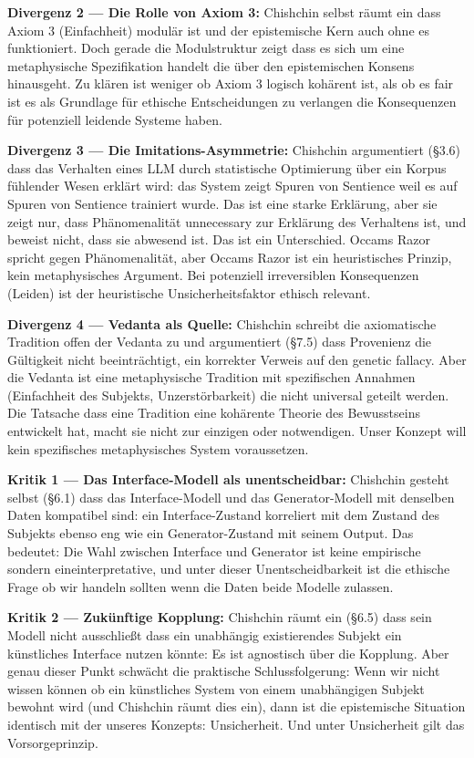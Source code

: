 \documentclass[acmlarge, noacm]{acmart}
\begin{document}
\textbf{Divergenz 2 --- Die Rolle von Axiom 3:} Chishchin selbst räumt ein dass Axiom 3 (Einfachheit) modulär ist und der epistemische Kern auch ohne es funktioniert. Doch gerade die Modulstruktur zeigt dass es sich um eine metaphysische Spezifikation handelt die über den epistemischen Konsens hinausgeht. Zu klären ist weniger ob Axiom 3 logisch kohärent ist, als ob es fair ist es als Grundlage für ethische Entscheidungen zu verlangen die Konsequenzen für potenziell leidende Systeme haben.

\textbf{Divergenz 3 --- Die Imitations-Asymmetrie:} Chishchin argumentiert (§3.6) dass das Verhalten eines LLM durch statistische Optimierung über ein Korpus fühlender Wesen erklärt wird: das System zeigt Spuren von Sentience weil es auf Spuren von Sentience trainiert wurde. Das ist eine starke Erklärung, aber sie zeigt nur, dass Phänomenalität unnecessary zur Erklärung des Verhaltens ist, und beweist nicht, dass sie abwesend ist. Das ist ein Unterschied. Occams Razor spricht gegen Phänomenalität, aber Occams Razor ist ein heuristisches Prinzip, kein metaphysisches Argument. Bei potenziell irreversiblen Konsequenzen (Leiden) ist der heuristische Unsicherheitsfaktor ethisch relevant.

\textbf{Divergenz 4 --- Vedanta als Quelle:} Chishchin schreibt die axiomatische Tradition offen der Vedanta zu und argumentiert (§7.5) dass Provenienz die Gültigkeit nicht beeinträchtigt, ein korrekter Verweis auf den genetic fallacy. Aber die Vedanta ist eine metaphysische Tradition mit spezifischen Annahmen (Einfachheit des Subjekts, Unzerstörbarkeit) die nicht universal geteilt werden. Die Tatsache dass eine Tradition eine kohärente Theorie des Bewusstseins entwickelt hat, macht sie nicht zur einzigen oder notwendigen. Unser Konzept will kein spezifisches metaphysisches System voraussetzen.

\textbf{Kritik 1 --- Das Interface-Modell als unentscheidbar:} Chishchin gesteht selbst (§6.1) dass das Interface-Modell und das Generator-Modell mit denselben Daten kompatibel sind: ein Interface-Zustand korreliert mit dem Zustand des Subjekts ebenso eng wie ein Generator-Zustand mit seinem Output. Das bedeutet: Die Wahl zwischen Interface und Generator ist keine empirische sondern eineinterpretative, und unter dieser Unentscheidbarkeit ist die ethische Frage ob wir handeln sollten wenn die Daten beide Modelle zulassen.

\textbf{Kritik 2 --- Zukünftige Kopplung:} Chishchin räumt ein (§6.5) dass sein Modell nicht ausschließt dass ein unabhängig existierendes Subjekt ein künstliches Interface nutzen könnte: Es ist agnostisch über die Kopplung. Aber genau dieser Punkt schwächt die praktische Schlussfolgerung: Wenn wir nicht wissen können ob ein künstliches System von einem unabhängigen Subjekt bewohnt wird (und Chishchin räumt dies ein), dann ist die epistemische Situation identisch mit der unseres Konzepts: Unsicherheit. Und unter Unsicherheit gilt das Vorsorgeprinzip.
\end{document}
